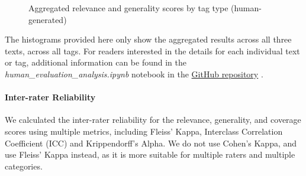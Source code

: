 \begin{figure}[h]
    \centering
    \hfill
    \caption{Aggregated relevance and generality scores by tag type (human-generated)}
    \label{fig:tags_analysis_human_multiple_documents}
\end{figure}


The histograms provided here only show the aggregated results across all three texts, across all tags. For readers interested in the details for each individual text or tag, additional information can be found in the \textit{human\_evaluation\_analysis.ipynb} notebook in the \href{https://github.com/ivangermanov/openml-tags}{GitHub repository} \cite{germanov_topic_modeling_of_2024}.

\paragraph{Inter-rater Reliability}
We calculated the inter-rater reliability for the relevance, generality, and coverage scores using multiple metrics, including Fleiss' Kappa, Interclass Correlation Coefficient (ICC) and Krippendorff's Alpha. We do not use Cohen's Kappa, and use Fleiss' Kappa instead, as it is more suitable for multiple raters and multiple categories.

